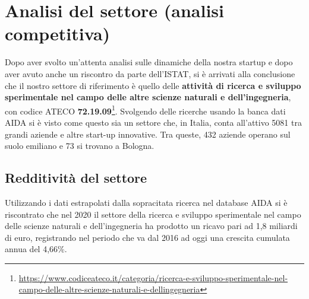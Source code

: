 

\renewcommand\tabularxcolumn[1]{m{#1}}

\section{Analisi del settore (analisi competitiva)}

Dopo aver svolto un'attenta analisi sulle dinamiche della nostra startup e dopo aver avuto anche un riscontro da parte dell'ISTAT, si è arrivati alla conclusione che il nostro settore di riferimento è quello delle \textbf{attività di ricerca e sviluppo sperimentale nel campo delle altre scienze naturali e dell'ingegneria}, con codice ATECO \textbf{72.19.09}\footnote{\url{https://www.codiceateco.it/categoria/ricerca-e-sviluppo-sperimentale-nel-campo-delle-altre-scienze-naturali-e-dellingegneria}}. Svolgendo delle ricerche usando la banca dati AIDA si è visto come questo sia un settore che, in Italia, conta all'attivo 5081 tra grandi aziende e altre start-up innovative. Tra queste, 432 aziende operano sul suolo emiliano e 73 si trovano a Bologna.

\subsection{Redditività del settore}

Utilizzando i dati estrapolati dalla sopracitata ricerca nel database AIDA si è riscontrato che nel 2020 il settore della ricerca e sviluppo sperimentale nel campo delle scienze naturali e dell'ingegneria ha prodotto un ricavo pari ad 1,8 miliardi di euro, registrando nel periodo che va dal 2016 ad oggi una crescita cumulata annua del 4,66\%.

